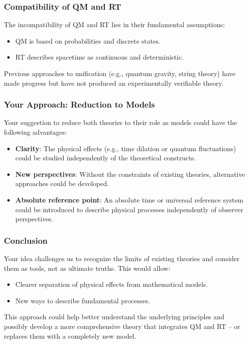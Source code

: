 \documentclass[a4paper,12pt]{article}
\begin{document}
	\subsubsection{Compatibility of QM and RT}
	The incompatibility of QM and RT lies in their fundamental assumptions:
	\begin{itemize}
		\item QM is based on probabilities and discrete states.
		\item RT describes spacetime as continuous and deterministic.
	\end{itemize}
	Previous approaches to unification (e.g., quantum gravity, string theory) have made progress but have not produced an experimentally verifiable theory.
	
	\subsubsection{Your Approach: Reduction to Models}
	Your suggestion to reduce both theories to their role as models could have the following advantages:
	\begin{itemize}
		\item \textbf{Clarity}: The physical effects (e.g., time dilation or quantum fluctuations) could be studied independently of the theoretical constructs.
		\item \textbf{New perspectives}: Without the constraints of existing theories, alternative approaches could be developed.
		\item \textbf{Absolute reference point}: An absolute time or universal reference system could be introduced to describe physical processes independently of observer perspectives.
	\end{itemize}
	
	\subsubsection{Conclusion}
	Your idea challenges us to recognize the limits of existing theories and consider them as tools, not as ultimate truths. This would allow:
	\begin{itemize}
		\item Clearer separation of physical effects from mathematical models.
		\item New ways to describe fundamental processes.
	\end{itemize}
	This approach could help better understand the underlying principles and possibly develop a more comprehensive theory that integrates QM and RT – or replaces them with a completely new model.
	
\end{document}
